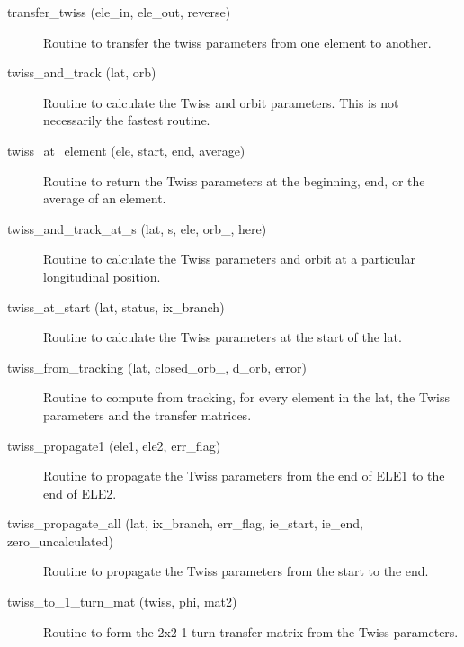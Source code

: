 \begin{description}
\label{r:transfer.twiss}
\item[transfer_twiss (ele_in, ele_out, reverse)] \Newline 
Routine to transfer the twiss parameters from one element to another.

\item[twiss_and_track (lat, orb)] \Newline
Routine to calculate the Twiss and orbit parameters. 
This is not necessarily the fastest routine. 

\label{r:twiss.at.element}
\item[twiss_at_element (ele, start, end, average)] \Newline
Routine to return the Twiss parameters at the beginning, end, or the average of an element. 

\item[twiss_and_track_at_s (lat, s, ele, orb_, here)] \Newline
Routine to calculate the Twiss parameters and orbit at a particular longitudinal position. 

\label{r:twiss.at.start}
\item[twiss_at_start (lat, status, ix_branch)] \Newline
Routine to calculate the Twiss parameters at the start of the lat. 

\label{r:twiss.from.tracking}
\item[twiss_from_tracking (lat, closed_orb_, d_orb, error)] \Newline
Routine to compute from tracking, for every element in the lat, 
the Twiss parameters and the transfer matrices. 

\label{r:twiss.propagate1}
\item[twiss_propagate1 (ele1, ele2, err_flag)] \Newline
Routine to propagate the Twiss parameters from the end of ELE1 to the end of ELE2. 

\label{r:twiss.propagate.all}
\item[twiss_propagate_all (lat, ix_branch, err_flag, ie_start, ie_end, zero_uncalculated)] \Newline
Routine to propagate the Twiss parameters from the start to the end. 

\label{r:twiss.to.1.turn.mat}
\item[twiss_to_1_turn_mat (twiss, phi, mat2)] \Newline
Routine to form the 2x2 1-turn transfer matrix from the Twiss parameters. 

\end{description}

